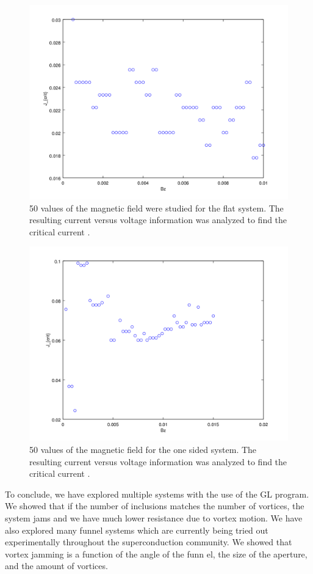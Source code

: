 \begin{figure}[htbp]
\begin{center}
\includegraphics[scale=.50]{flatBz.png}
\caption{ 50 values of the magnetic field were studied for the flat system. The resulting current versus voltage information was analyzed to find the critical current .  }
\label{flatBz}
\end{center}
\end{figure}

\begin{figure}[htbp]
\begin{center}
\includegraphics[scale=.50]{oneSideBz.png}
\caption{ 50 values of the magnetic field for the one sided system. The resulting current versus voltage information was analyzed to find the critical current .  }
\label{oneBz}
\end{center}
\end{figure}

To conclude, we have explored multiple systems with the use of the GL program. We showed that if the number of inclusions matches the number of vortices, the system jams and we have much lower resistance due to vortex motion. We have also explored many funnel systems which are currently being tried out experimentally throughout the superconduction community. We showed that vortex jamming is a function of the angle of the funn
el, the size of the aperture, and the amount of vortices.

 
